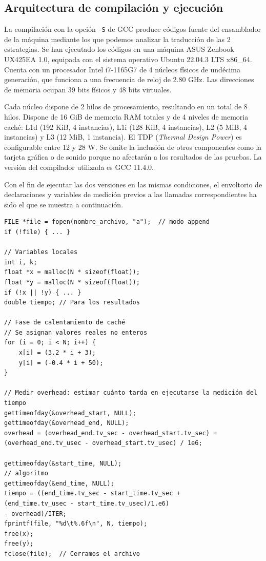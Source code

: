 \documentclass[11pt,a4paper,twoside]{article}
\theoremstyle{definition}
\begin{document}
	\subsection{Arquitectura de compilación y ejecución}
	
	La compilación con la opción \texttt{-S} de GCC produce códigos fuente del ensamblador de la máquina mediante los que podemos analizar la traducción de las 2 estrategias. Se han ejecutado los códigos en una máquina ASUS Zenbook UX425EA 1.0, equipada con el sistema operativo Ubuntu 22.04.3 LTS x86\_64. Cuenta con un procesador Intel i7-1165G7 de 4 núcleos físicos de undécima generación, que funciona a una frecuencia de reloj de 2.80 GHz. Las direcciones de memoria ocupan 39 bits físicos y 48 bits virtuales.
	
	Cada núcleo dispone de 2 hilos de procesamiento, resultando en un total de 8 hilos. Dispone de 16 GiB de memoria RAM totales y de 4 niveles de memoria caché: L1d (192 KiB, 4 instancias), L1i (128 KiB, 4 instancias), L2 (5 MiB, 4 instancias) y L3 (12 MiB, 1 instancia). El TDP (\textit{Thermal Design Power}) es configurable entre 12 y 28 W. Se omite la inclusión de otros componentes como la tarjeta gráfica o de sonido porque no afectarán a los resultados de las pruebas. La versión del compilador utilizada es GCC 11.4.0.

	Con el fin de ejecutar las dos versiones en las mismas condiciones, el envoltorio de declaraciones y variables de medición previos a las llamadas correspondientes ha sido el que se muestra a continuación.
	
	\begin{verbatim}
FILE *file = fopen(nombre_archivo, "a");  // modo append
if (!file) { ... }

// Variables locales
int i, k;
float *x = malloc(N * sizeof(float));
float *y = malloc(N * sizeof(float));
if (!x || !y) { ... }
double tiempo; // Para los resultados

// Fase de calentamiento de caché
// Se asignan valores reales no enteros
for (i = 0; i < N; i++) {
	x[i] = (3.2 * i + 3);
	y[i] = (-0.4 * i + 50);
}

// Medir overhead: estimar cuánto tarda en ejecutarse la medición del tiempo
gettimeofday(&overhead_start, NULL);
gettimeofday(&overhead_end, NULL);
overhead = (overhead_end.tv_sec - overhead_start.tv_sec) +
(overhead_end.tv_usec - overhead_start.tv_usec) / 1e6;

gettimeofday(&start_time, NULL);
// algoritmo
gettimeofday(&end_time, NULL);
tiempo = ((end_time.tv_sec - start_time.tv_sec +
(end_time.tv_usec - start_time.tv_usec)/1.e6)
- overhead)/ITER;
fprintf(file, "%d\t%.6f\n", N, tiempo);
free(x);
free(y);
fclose(file);  // Cerramos el archivo
	\end{verbatim}
\end{document}
